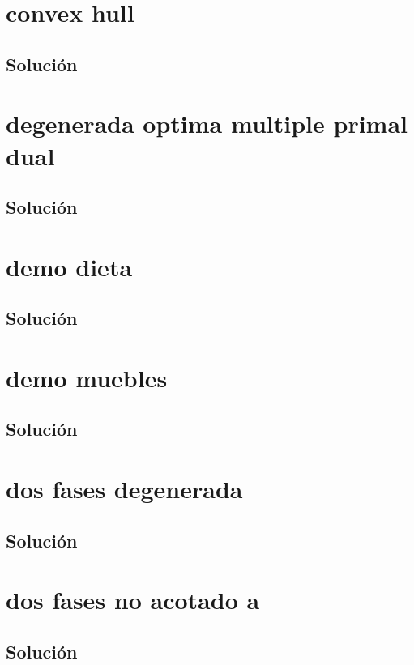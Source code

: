 \section{convex hull}

\subsection*{Solución}

\clearpage
\section{degenerada optima multiple primal dual}

\subsection*{Solución}

\clearpage
\section{demo dieta}

\subsection*{Solución}

\clearpage
\section{demo muebles}

\subsection*{Solución}

\clearpage
\section{dos fases degenerada}

\subsection*{Solución}

\clearpage
\section{dos fases no acotado a}

\subsection*{Solución}

\clearpage
